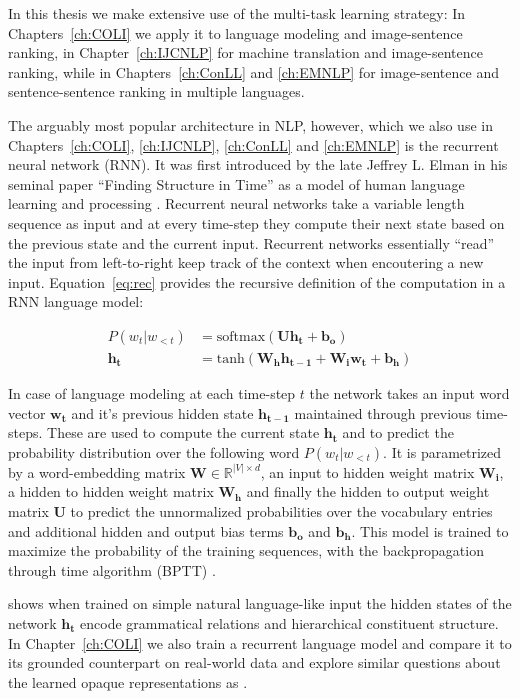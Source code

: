 In this thesis we make extensive use of the  multi-task learning strategy: 
In Chapters~\ref{ch:COLI} we apply it to language modeling and image-sentence ranking, 
in Chapter~\ref{ch:IJCNLP} for machine translation
and image-sentence ranking, while in Chapters~\ref{ch:ConLL} and \ref{ch:EMNLP} for image-sentence
and sentence-sentence ranking in multiple languages.

The arguably most popular architecture in NLP, however, which we also use in
Chapters~\ref{ch:COLI}, \ref{ch:IJCNLP}, \ref{ch:ConLL} and \ref{ch:EMNLP}
is the recurrent neural network (RNN). It was
first introduced by the late Jeffrey L. Elman in his seminal paper  ``Finding Structure in Time''
as a model of human language learning and processing \citep{elman1990finding}. Recurrent neural networks
take a variable length sequence as input and at every time-step they compute their next state
based on the previous state and the current input. Recurrent networks 
essentially ``read'' the input from left-to-right keep track of the context when encoutering a new input.
Equation~\ref{eq:rec} provides the recursive definition of the computation in a RNN language model:

\begin{align}
\label{eq:rec}
P(w_t|w_{<t}) &= \text{softmax}(\mathbf{U} \mathbf{h_t} + \mathbf{b_o}) \\
\mathbf{h_t} &= \text{tanh}(\mathbf{W_h}\mathbf{h_{t-1}} + \mathbf{W_i}\mathbf{w_t} + \mathbf{b_h})
\end{align}

In case of language modeling at each time-step $t$ the network takes an input word vector $\mathbf{w_t}$
and it's previous hidden state $\mathbf{h_{t-1}}$ maintained through previous
time-steps. These are used to compute the current
state $\mathbf{h_t}$ and to predict the probability distribution over the following word $P(w_t|w_{<t})$.
It is parametrized by a word-embedding matrix $\mathbf{W} \in \mathbb{R}^{|V| \times d}$,
an input to hidden weight matrix $\mathbf{W_i}$, a hidden to hidden weight
matrix $\mathbf{W_h}$ and finally the hidden to output
weight matrix $\mathbf{U}$ to predict the unnormalized probabilities over the vocabulary entries and additional
hidden and output bias terms $ \mathbf{b_o}$ and $ \mathbf{b_h}$.
This model is trained to maximize the probability of the training sequences, 
with the backpropagation through time algorithm (BPTT)
\citep{robinson1987utility,werbos1988generalization,williams1995gradient}.

\cite{elman1991distributed} shows when trained on simple natural language-like input the
hidden states of the network $\mathbf{h_t}$ encode grammatical relations and hierarchical
constituent structure. In Chapter~\ref{ch:COLI} we also train a recurrent language model
and compare it to its grounded counterpart
on real-world data and explore similar questions about the learned opaque representations
as \cite{elman1991distributed} .

